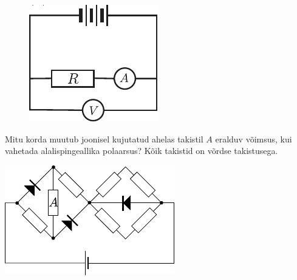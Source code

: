 \documentclass[10pt, twoside]{article}
\begin{document}
{\begin{figure}[h]
\begin{minipage}[b]{0.3\textwidth}
		\includegraphics[width=\linewidth]{2005-v2g-04-yl2}
    \end{minipage}
\end{figure}
\probend
\bigskip


Mitu korda muutub joonisel kujutatud ahelas takistil $A$ eralduv võimsus, kui vahetada alalispingeallika polaarsus? Kõik takistid on võrdse takistusega.

\begin{center}
	\includegraphics[width=0.6\linewidth]{2005-v3g-04-yl}
\end{center}
\probend
\bigskip


}
\end{document}
